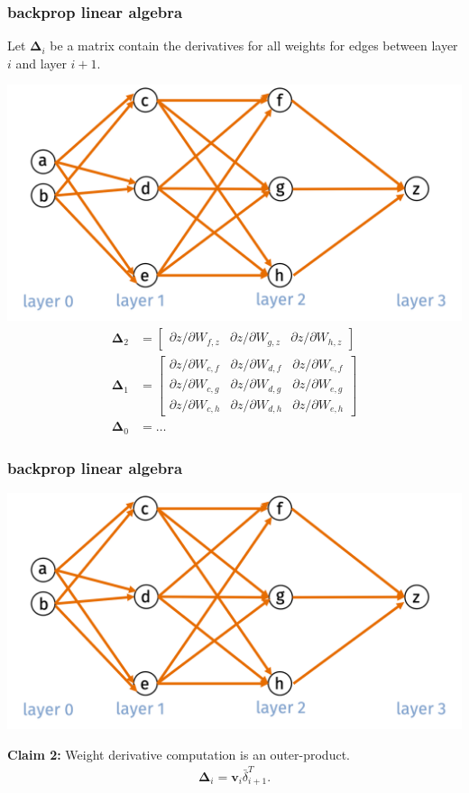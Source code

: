 \documentclass[handout,compress]{beamer}
\newcommand{\bs}[1]{\boldsymbol{#1}}
\newcommand{\bv}[1]{\mathbf{#1}}
\begin{document}
	\begin{frame}
		\frametitle{backprop linear algebra}
		\small
		
		Let $\bs{\Delta}_i$ be a matrix contain the derivatives for all weights for edges between layer $i$ and layer $i+1$. 
		
		\includegraphics[width=.5\textwidth]{all_edges.png}
		\begin{align*}
		\bs{\Delta}_2 &= \begin{bmatrix}\partial z/\partial W_{f,z}&\partial z/\partial W_{g,z}& \partial z/\partial W_{h,z}\end{bmatrix} \\
		\bs{\Delta}_1 &= \begin{bmatrix}\partial z/\partial W_{c,f}&\partial z/\partial W_{d,f}& \partial z/\partial W_{e,f}\\
		\partial z/\partial W_{c,g}&\partial z/\partial W_{d,g}& \partial z/\partial W_{e,g}\\
		\partial z/\partial W_{c,h}&\partial z/\partial W_{d,h}& \partial z/\partial W_{e,h}
		\end{bmatrix}\\
		\bs{\Delta}_0 &= \ldots
		\end{align*}
	\end{frame}
	
	\begin{frame}
		\frametitle{backprop linear algebra}
		\small
		
		\includegraphics[width=.5\textwidth]{all_edges.png}
		
		\textbf{Claim 2:} Weight derivative computation is an outer-product.
		\begin{align*}
		\bs{\Delta}_i = \bv{v}_i\bar{\delta}_{i+1}^T.
		\end{align*}
	\end{frame}
	
\end{document}
